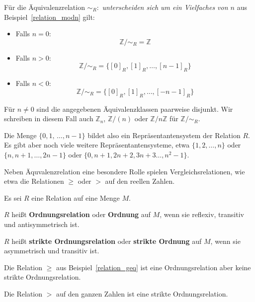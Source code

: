 \begin{beispiel}\label{rela_z_mod_n} 
Für die Äquivalenzrelation $\sim_R:$ \textit{unterscheiden sich um ein Vielfaches von $n$} aus 
Beispiel~\ref{relation_modn} gilt:

\begin{itemize}
\item Falls $n = 0$:
  	$$ \mathbb Z/\sim_R = \mathbb Z$$
\item Falls $n > 0$: 
  	$$ \mathbb Z/\sim_R = \{ [0]_R, [1]_R, \ldots , [n-1]_R \} $$
\item Falls $n < 0$:
  	$$ \mathbb Z/\sim_R = \{ [0]_R, [1]_R, \ldots , [-n-1]_R \} $$
\end{itemize}
Für $n \neq 0$ sind die angegebenen Äquivalenzklassen paarweise disjunkt. Wir schreiben in diesem Fall 
auch $\mathbb Z_n$, $\mathbb Z/(n)$ oder $\mathbb Z / n \mathbb Z$ für $\mathbb Z/\sim_R$.

Die Menge $\{0, 1, \, \ldots , n-1\}$ bildet also ein Repräsentantensystem der Relation $R$. Es gibt aber 
noch viele weitere Repräsentantensysteme, etwa $\{1, 2, \ldots, n \}$ oder $\{n, n+1, \ldots, 2n-1\}$ oder
$\{0, n+ 1, 2n+2, 3n+3 \ldots, n^2-1 \}$.
\end{beispiel}

\bigbreak

Neben Äquvalenzrelation eine besondere Rolle spielen Vergleichsrelationen, wie etwa die Relationen $\geq$ 
oder $>$ auf den reellen Zahlen. 

\begin{definition} Es sei $R$ eine Relation auf eine Menge $M$.

$R$ heißt \textbf{Ordnungsrelation} oder \textbf{Ordnung} auf $M$, wenn sie 
reflexiv, transitiv und antisymmetrisch ist.

$R$ heißt \textbf{strikte Ordnungsrelation} oder \textbf{strikte Ordnung} 
auf $M$, wenn sie asymmetrisch und  transitiv ist.
\end{definition}

\begin{beispiel} Die Relation $\geq$ aus Beispiel~\ref{relation_geq} ist eine Ordnungsrelation aber keine 
strikte Ordnungsrelation.
\end{beispiel}

\begin{beispiel} Die Relation $>$ auf den ganzen Zahlen ist eine strikte Ordnungsrelation.
\end{beispiel}


